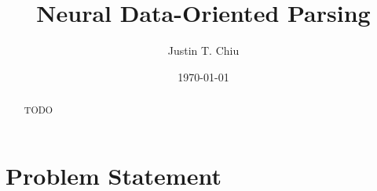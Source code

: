 \documentclass[12pt]{article}
\title{Neural Data-Oriented Parsing}
\author{
Justin T. Chiu
}
\date{\today}
\begin{document}
\maketitle

\begin{abstract}
TODO
\end{abstract}

\section{Problem Statement}



\end{document}

